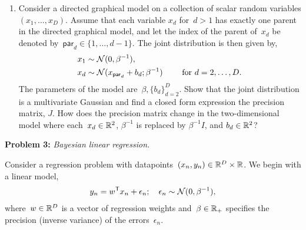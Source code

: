 \documentclass[11pt]{article}
\begin{document}
\begin{enumerate}[label=(\alph*)]
\item  Consider a directed graphical model on a collection of scalar random variables $(x_1, \ldots, x_D)$.  Assume that each variable $x_d$ for~$d > 1$ has exactly one parent in the directed graphical model, and let the index of the parent of~$x_d$ be denoted by~$\mathsf{par}_d \in \{1, \ldots, d-1\}$.  The joint distribution is then given by,
\begin{align*}
    x_1 &\sim \mathcal{N}(0, \beta^{-1}), \\
    x_{d} &\sim \mathcal{N}(x_{\mathsf{par}_d} + b_d; \beta^{-1}) \qquad \text{ for } d=2, \ldots, D.
\end{align*}
The parameters of the model are~$\beta, \{b_d\}_{d=2}^D$.  Show that the joint distribution is a multivariate Gaussian and find a closed form expression the precision matrix, $J$.  How does the precision matrix change in the two-dimensional model where each~$x_d \in \mathbb{R}^2$, $\beta^{-1}$ is replaced by $\beta^{-1}I$, and $b_d \in \mathbb{R}^2$?

\end{enumerate}

\clearpage

\textbf{Problem 3:} \textit{Bayesian linear regression.}  

Consider a regression problem with datapoints~$(x_n, y_n) \in \mathbb{R}^{D} \times \mathbb{R}$. We begin with a linear model,
\begin{align*}
    y_n = w^{\mathsf{T}} x_n + \epsilon_n;  \quad \epsilon_n \sim \mathcal{N}(0, \beta^{-1}),
\end{align*}
where~$w \in \mathbb{R}^{D}$ is a vector of regression weights and~$\beta \in \mathbb{R}_+$ specifies the precision (inverse variance) of the errors~$\epsilon_n$. 
\end{document}
